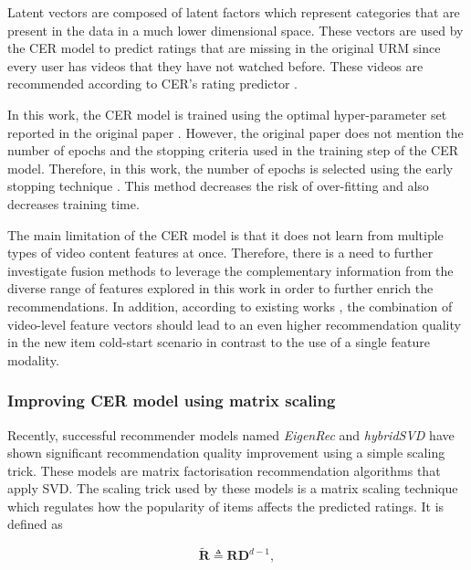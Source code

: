 \documentclass[review]{elsarticle}
\begin{document}
Latent vectors are composed of latent factors which represent categories that are present in the data in a much lower dimensional space. These vectors are used by the \ac{CER} model to predict ratings that are missing in the original \ac{URM} since every user has videos that they have not watched before. These videos are recommended according to CER's rating predictor \citep{du2018personalized}. 

In this work, the CER model is trained using the optimal hyper-parameter set reported in the original paper \citep{du2018personalized}. However, the original paper does not mention the number of epochs and the stopping criteria used in the training step of the CER model. Therefore, in this work, the number of epochs is selected using the early stopping technique \citep{dacrema2019troubling}. This method decreases the risk of over-fitting and also decreases training time.





The main limitation of the \ac{CER} model is that it does not learn from multiple types of video content features at once. Therefore, there is a need to further investigate fusion methods to leverage the complementary information from the diverse range of features explored in this work in order to further enrich the recommendations. In addition, according to existing works \citep{lee2017large, ma2018lga}, the combination of video-level feature vectors should lead to an even higher recommendation quality in the new item cold-start scenario in contrast to the use of a single feature modality.



\subsubsection{Improving CER model using matrix scaling}\label{sec:scaledCER}

Recently, successful recommender models named \textit{EigenRec} \citep{nikolakopoulos2019eigenrec} and \sloppy \textit{hybridSVD} \citep{frolov2019hybridsvd} have shown significant recommendation quality improvement using a simple scaling trick. These models are matrix factorisation recommendation algorithms that apply \ac{SVD}. The scaling trick used by these models is a matrix scaling technique which regulates how the popularity of items affects the predicted ratings. It is defined as \citep{nikolakopoulos2019eigenrec}  

\begin{equation}
    \widetilde{\mathbf{R}} \triangleq \mathbf{R}\mathbf{D}^{d-1},
    \label{eq:matrix_scaling}
\end{equation}
\end{document}
